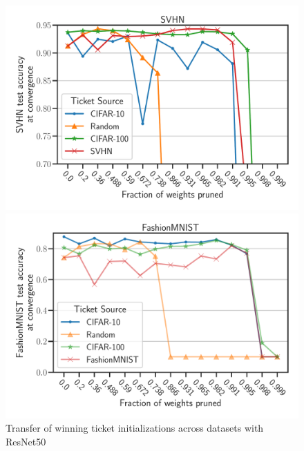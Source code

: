 \documentclass{article}
\begin{document}
\begin{figure}[h]
\begin{minipage}{.497\textwidth}
    \end{minipage}
    \begin{minipage}{.497\textwidth}
    \includegraphics[width=\textwidth]{plots/Exp2_ResNet_SVHN_N.pdf}
    \end{minipage}
    \begin{minipage}{.497\textwidth}
    \includegraphics[width=\textwidth]{plots/Exp2_Resnet_FashionMNIST1_N.pdf}
    \end{minipage}
    \caption{Transfer of winning ticket initializations across datasets with ResNet50}
    \label{fig:exp2_resnet}
\end{figure}
\end{document}
